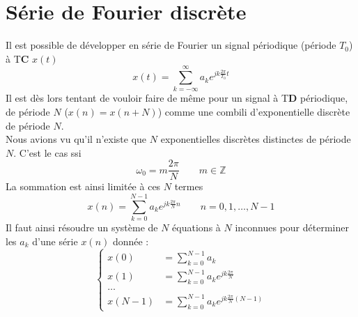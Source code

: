 \section{Série de Fourier discrète}
Il est possible de développer en série de Fourier un signal périodique (période $T_0$) 
à T\textbf{C} $x(t)$ 
\begin{equation}
x(t) = \sum_{k=-\infty}^\infty a_k e^{jk\frac{2\pi}{T_0}t}
\end{equation}
Il est dès lors tentant de vouloir faire de même pour un signal à T\textbf{D} périodique, 
de période $N$ ($x(n)=x(n+N)$) comme une combili d'exponentielle discrète de période $N$.\\
Nous avions vu qu'il n'existe que $N$ exponentielles discrètes distinctes de période $N$. 
C'est le cas ssi
\begin{equation}
\omega_0 = m\dfrac{2\pi}{N}\qquad m\in\mathbb{Z}
\end{equation}
La sommation est ainsi limitée à ces $N$ termes
\begin{equation}
x(n) = \sum_{k=0}^{N-1} a_ke^{jk\frac{2\pi}{N}n}\qquad n=0,1,\dots,N-1
\label{eq:syst}
\end{equation}
Il faut ainsi résoudre un système de $N$ équations à $N$ inconnues pour déterminer les $a_k$ 
d'une série $x(n)$ donnée :
\begin{equation}
\left\{\begin{array}{ll}
x(0) &= \sum_{k=0}^{N-1} a_k\\
x(1) &= \sum_{k=0}^{N-1} a_ke^{jk\frac{2\pi}{N}}\\
\dots\\
x(N-1) &= \sum_{k=0}^{N-1} a_ke^{jk\frac{2\pi}{N}(N-1)}
\end{array}\right.
\end{equation}


